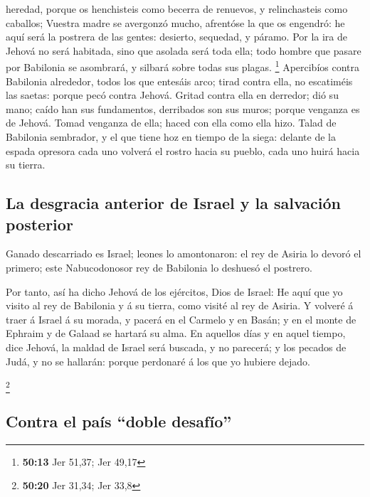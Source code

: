 heredad, porque os henchisteis como becerra de renuevos, y relinchasteis
como caballos;  Vuestra madre se avergonzó mucho, afrentóse
la que os engendró: he aquí será la postrera de las gentes: desierto,
sequedad, y páramo.  Por la ira de Jehová no será habitada,
sino que asolada será toda ella; todo hombre que pasare por Babilonia se
asombrará, y silbará sobre todas sus plagas. \footnote{\textbf{50:13}
  Jer 51,37; Jer 49,17}  Apercibíos contra Babilonia
alrededor, todos los que entesáis arco; tirad contra ella, no escatiméis
las saetas: porque pecó contra Jehová.  Gritad contra ella
en derredor; dió su mano; caído han sus fundamentos, derribados son sus
muros; porque venganza es de Jehová. Tomad venganza de ella; haced con
ella como ella hizo.  Talad de Babilonia sembrador, y el
que tiene hoz en tiempo de la siega: delante de la espada opresora cada
uno volverá el rostro hacia su pueblo, cada uno huirá hacia su tierra.

\hypertarget{la-desgracia-anterior-de-israel-y-la-salvaciuxf3n-posterior}{%
\subsection{La desgracia anterior de Israel y la salvación
posterior}\label{la-desgracia-anterior-de-israel-y-la-salvaciuxf3n-posterior}}

 Ganado descarriado es Israel; leones lo amontonaron: el
rey de Asiria lo devoró el primero; este Nabucodonosor rey de Babilonia
lo deshuesó el postrero.

 Por tanto, así ha dicho Jehová de los ejércitos, Dios de
Israel: He aquí que yo visito al rey de Babilonia y á su tierra, como
visité al rey de Asiria.  Y volveré á traer á Israel á su
morada, y pacerá en el Carmelo y en Basán; y en el monte de Ephraim y de
Galaad se hartará su alma.  En aquellos días y en aquel
tiempo, dice Jehová, la maldad de Israel será buscada, y no parecerá; y
los pecados de Judá, y no se hallarán: porque perdonaré á los que yo
hubiere dejado.

\footnote{\textbf{50:20} Jer 31,34; Jer 33,8}

\hypertarget{contra-el-pauxeds-doble-desafuxedo}{%
\subsection{Contra el país ``doble
desafío''}\label{contra-el-pauxeds-doble-desafuxedo}}

